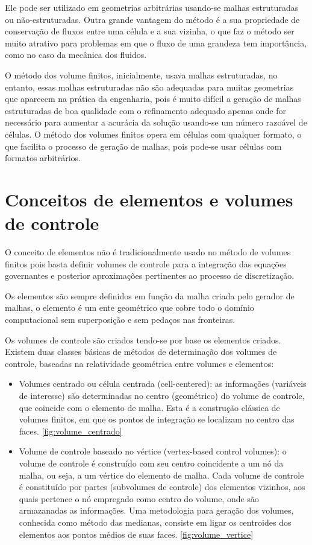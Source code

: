 Ele pode ser utilizado em geometrias arbitrárias usando-se malhas estruturadas ou não-estruturadas. Outra grande vantagem do método é a sua propriedade de conservação de fluxos entre uma célula e a sua vizinha, o que faz o método ser muito atrativo para problemas em que o fluxo de uma grandeza tem importância, como no caso da mecânica dos fluidos.

O método dos volume finitos, inicialmente, usava malhas estruturadas, no entanto, essas malhas estruturadas não são adequadas para muitas geometrias que aparecem na prática da engenharia, pois é muito difícil a geração de malhas estruturadas de boa qualidade com o refinamento adequado apenas onde for necessário para aumentar a acurácia da solução usando-se um número razoável de células. O método dos volumes finitos opera em células com qualquer formato, o que facilita o processo de geração de malhas, pois pode-se usar células com formatos arbitrários. \cite{doi:10.1080/10407791003685155}

\section{Conceitos de elementos e volumes de controle}

O conceito de elementos não é tradicionalmente usado no método de volumes finitos pois basta definir volumes de controle para a integração das equações governantes e posterior aproximações pertinentes ao processo de discretização. \cite{Versteeg2007}

Os elementos são sempre definidos em função da malha criada pelo gerador de malhas, o elemento é um ente geométrico que cobre todo o domínio computacional sem superposição e sem pedaços nas fronteiras.

Os volumes de controle são criados tendo-se por base os elementos criados. Existem duas classes básicas de métodos de determinação dos volumes de controle, baseadas na relatividade geométrica entre volumes e elementos:

\begin{itemize}
    \item Volumes centrado ou célula centrada (cell-centered): as informações (variáveis de interesse) são determinadas no centro (geométrico) do volume de controle, que coincide com o elemento de malha. Esta é a construção clássica de volumes finitos, em que os pontos de integração se localizam no centro das faces. \ref{fig:volume_centrado}
    \item Volume de controle baseado no vértice (vertex-based control volumes): o volume de controle é construído com seu centro coincidente a um nó da malha, ou seja, a um vértice do elemento de malha. Cada volume de controle é constituído por partes (subvolumes de controle) dos elementos vizinhos, aos quais pertence o nó empregado como centro do volume, onde são armazanadas as informações. Uma metodologia para geração dos volumes, conhecida como método das medianas, consiste em ligar os centroides dos elementos aos pontos médios de suas faces. \ref{fig:volume_vertice}
\end{itemize}

